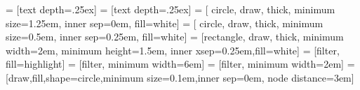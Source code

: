  = [text depth=.25ex]
 = [text depth=.25ex]
 = [ circle, draw, thick, minimum size=1.25em, inner sep=0em, fill=white]
 = [ circle, draw, thick, minimum size=0.5em, inner sep=0.25em, fill=white]
 = [rectangle, draw, thick, minimum width=2em, minimum height=1.5em, inner xsep=0.25em,fill=white]
 = [filter, fill=highlight]
 = [filter, minimum width=6em]
 = [filter, minimum width=2em]
 = [draw,fill,shape=circle,minimum size=0.1em,inner sep=0em, node distance=3em]

\newlength{\xunit}
\newlength{\yunit}
\makeatletter
{}
